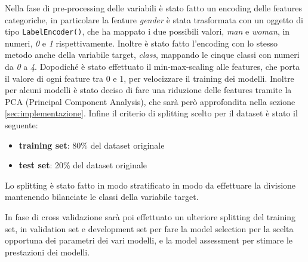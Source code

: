 Nella fase di pre-processing delle variabili è stato fatto un encoding delle features categoriche, in particolare la feature \textit{gender} è stata trasformata con un oggetto di tipo \verb+LabelEncoder()+, che ha mappato i due possibili valori, \textit{man} e \textit{woman}, in numeri, \textit{0} e \textit{1} rispettivamente.  Inoltre è stato fatto l'encoding con lo stesso metodo anche della variabile target, \textit{class}, mappando le cinque classi con numeri da \textit{0} a \textit{4}. Dopodiché è stato effettuato il min-max-scaling alle features, che porta il valore di ogni feature tra 0 e 1, per velocizzare il training dei modelli.  Inoltre per alcuni modelli è stato deciso di fare una riduzione delle features tramite la PCA (Principal Component Analysis), che sarà però approfondita nella sezione \ref{sec:implementazione}.
Infine il criterio di splitting scelto per il dataset è stato il seguente:
\begin{itemize}
\item \textbf{training set}: 80\% del dataset originale
\item \textbf{test set}: 20\% del dataset originale
\end{itemize}
Lo splitting è stato fatto in modo stratificato in modo da effettuare la divisione mantenendo bilanciate le classi della variabile target.

In fase di cross validazione sarà poi effettuato un ulteriore splitting del training set, in validation set e development set per fare la model selection per la scelta opportuna dei parametri dei vari modelli, e la model assessment per stimare le prestazioni dei modelli. 